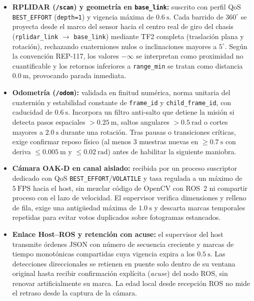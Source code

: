 \documentclass[11pt,a4paper]{article}
\begin{document}
\begin{itemize}
  \item \textbf{RPLIDAR (\texttt{/scan}) y geometría en \texttt{base\_link}:}
  suscrito con perfil QoS \texttt{BEST\_EFFORT} (\texttt{depth=1}) y vigencia
  máxima de $0.6\ \mathrm{s}$. Cada barrido de $360^\circ$ se proyecta desde el
  marco del sensor hacia el centro real de giro del chasis
  (\texttt{rplidar\_link} $\rightarrow$ \texttt{base\_link}) mediante TF2
  completa (traslación plana y rotación), rechazando cuaterniones nulos o
  inclinaciones mayores a $5^\circ$. Según la convención REP-117, los valores
  $-\infty$ se interpretan como proximidad no cuantificable y los retornos
  inferiores a \texttt{range\_min} se tratan como distancia $0.0\ \mathrm{m}$,
  provocando parada inmediata.

  \item \textbf{Odometría (\texttt{/odom}):} validada en finitud numérica,
  norma unitaria del cuaternión y estabilidad constante de \texttt{frame\_id} y
  \texttt{child\_frame\_id}, con caducidad de $0.6\ \mathrm{s}$. Incorpora un
  filtro anti-salto que detiene la misión si detecta pasos espaciales
  $>0.25\ \mathrm{m}$, saltos angulares $>0.5\ \mathrm{rad}$ o cortes mayores a
  $2.0\ \mathrm{s}$ durante una rotación. Tras pausas o transiciones críticas,
  exige confirmar reposo físico (al menos $3$ muestras nuevas en
  $\ge 0.7\ \mathrm{s}$ con deriva $\le 0.005\ \mathrm{m}$ y
  $\le 0.02\ \mathrm{rad}$) antes de habilitar la siguiente maniobra.

  \item \textbf{Cámara OAK-D en canal aislado:} recibida por un proceso
  suscriptor dedicado con QoS \texttt{BEST\_EFFORT}/\texttt{VOLATILE} y tasa
  regulada a un máximo de $5\ \mathrm{FPS}$ hacia el host, sin mezclar código de
  OpenCV con ROS~2 ni compartir proceso con el lazo de velocidad. El supervisor
  verifica dimensiones y relleno de fila, exige una antigüedad máxima de
  $1.0\ \mathrm{s}$ y descarta marcas temporales repetidas para evitar votos
  duplicados sobre fotogramas estancados.

  \item \textbf{Enlace Host--ROS y retención con acuse:} el supervisor del host
  transmite órdenes JSON con número de secuencia creciente y marcas de tiempo
  monotónicas compartidas cuya vigencia expira a los $0.5\ \mathrm{s}$. Las
  detecciones direccionales se retienen en puente solo dentro de su ventana
  original hasta recibir confirmación explícita (\textit{acuse}) del nodo ROS,
  sin renovar artificialmente su marca. La edad local desde recepción ROS no
  mide el retraso desde la captura de la cámara.
\end{itemize}
\end{document}
